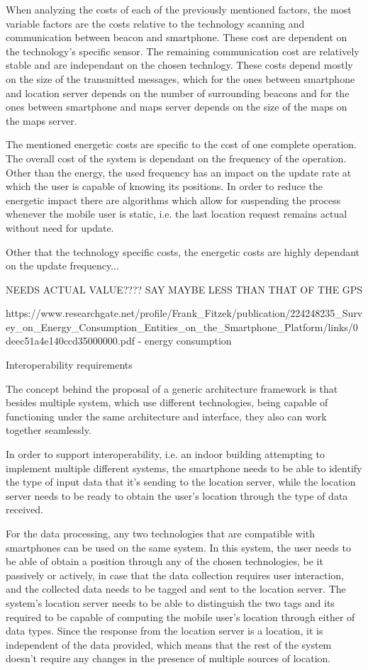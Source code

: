 When analyzing the costs of each of the previously mentioned factors, the most variable factors are the costs relative to the technology scanning and communication between beacon and smartphone. These cost are dependent on the technology's specific sensor. The remaining communication cost are relatively stable and are independant on the chosen technlogy. These costs depend mostly on the size of the transmitted messages, which for the ones between smartphone and location server depends on the number of surrounding beacons and for the ones between smartphone and maps server depends on the size of the maps on the maps server.  

The mentioned energetic costs are specific to the cost of one complete operation. The overall cost of the system is dependant on the frequency of the operation. Other than the energy, the used frequency has an impact on the update rate at which the user is capable of knowing its positions. In order to reduce the energetic impact there are algorithms which allow for suspending the process whenever the mobile user is static, i.e. the last location request remains actual without need for update.

Other that the technology specific costs, the energetic costs are highly dependant on the update frequency... 

NEEDS ACTUAL VALUE???? SAY MAYBE LESS THAN THAT OF THE GPS

https://www.researchgate.net/profile/Frank_Fitzek/publication/224248235_Survey_on_Energy_Consumption_Entities_on_the_Smartphone_Platform/links/0deec51a4e140ccd35000000.pdf - energy consumption


Interoperability requirements

The concept behind the proposal of a generic architecture framework is that besides multiple system, which use different technologies, being capable of functioning under the same architecture and interface, they also can work together seamlessly. 

In order to support interoperability, i.e. an indoor building attempting to implement multiple different systems, the smartphone needs to be able to identify the type of input data that it's sending to the location server, while the location server needs to be ready to obtain the user's location through the type of data received.

For the data processing, any two technologies that are compatible with smartphones can be used on the same system. In this system, the user needs to be able of obtain a position through any of the chosen technologies, be it passively or actively, in case that the data collection requires user interaction, and the collected data needs to be tagged and sent to the location server. The system's location server needs to be able to distinguish the two tags and its required to be capable of computing the mobile user's location through either of data types. Since the response from the location server is a location, it is independent of the data provided, which means that the rest of the system doesn't require any changes in the presence of multiple sources of location.


